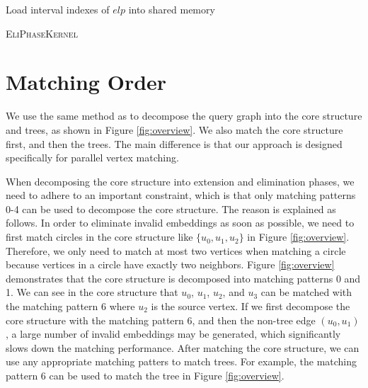 \begin{algorithm}[t!]
Load interval indexes of $elp$ into shared memory\;
\caption{\textsc{EliPhaseKernel}}
\label{algo:eliphase}
\end{algorithm}



\section{Matching Order\label{sec:matchingorder}}
We use the same method as \cite{bi2016efficient} to decompose the query graph into the core structure and trees, as shown in Figure \ref{fig:overview}. We also match the core structure first, and then the trees. The main difference is that our approach is designed specifically for parallel vertex matching.

When decomposing the core structure into extension and elimination phases, we need to adhere to an important constraint, which is that only matching patterns 0-4 can be used to decompose the core structure. The reason is explained as follows. In order to eliminate invalid embeddings as soon as possible, we need to first match circles in the core structure like $\{u_0, u_1, u_2\}$ in Figure \ref{fig:overview}. Therefore, we only need to match at most two vertices when matching a circle because vertices in a circle have exactly two neighbors. Figure \ref{fig:overview} demonstrates that the core structure is decomposed into matching patterns 0 and 1. We can see in the core structure that $u_0$, $u_1$, $u_2$, and $u_3$ can be matched with the matching pattern 6 where $u_2$ is the source vertex. If we first decompose the core structure with the matching pattern 6, and then the non-tree edge $(u_0, u_1)$, a large number of invalid embeddings may be generated, which significantly slows down the matching performance. After matching the core structure, we can use any appropriate matching patters to match trees. For example, the matching pattern 6 can be used to match the tree in Figure \ref{fig:overview}.


